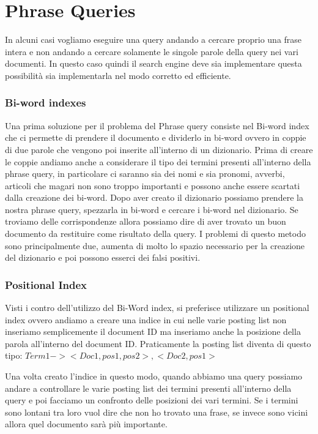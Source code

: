 \documentclass[14pt]{extreport}
\begin{document}
\chapter{Phrase Queries}

In alcuni casi vogliamo eseguire una query andando a cercare proprio una frase intera e non andando a cercare solamente le singole parole della query nei vari documenti. In questo caso quindi il search engine deve sia implementare questa possibilità sia implementarla nel modo corretto ed efficiente.


\subsection{Bi-word indexes}

Una prima soluzione per il problema del Phrase query consiste nel Bi-word index che ci permette di prendere il documento e dividerlo in bi-word ovvero in coppie di due parole che vengono poi inserite all'interno di un dizionario.
Prima di creare le coppie andiamo anche a considerare il tipo dei termini presenti all'interno della phrase query, in particolare ci saranno sia dei nomi e sia pronomi, avverbi, articoli che magari non sono troppo importanti e possono anche essere scartati dalla creazione dei bi-word.
Dopo aver creato il dizionario possiamo prendere la nostra phrase query, spezzarla in bi-word e cercare i bi-word nel dizionario.
Se troviamo delle corrispondenze allora possiamo dire di aver trovato un buon documento da restituire come risultato della query.
I problemi di questo metodo sono principalmente due, aumenta di molto lo spazio necessario per la creazione del dizionario e poi possono esserci dei falsi positivi.

\subsection{Positional Index}

Visti i contro dell'utilizzo del Bi-Word index, si preferisce utilizzare un positional index ovvero andiamo a creare una indice in cui nelle varie posting list non inseriamo semplicemente il document ID ma inseriamo anche la posizione della parola all'interno del document ID.
Praticamente la posting list diventa di questo tipo:
\newline
$Term1 -> <Doc1, pos1, pos2>, <Doc2, pos1>$

Una volta creato l'indice in questo modo, quando abbiamo una query possiamo andare a controllare le varie posting list dei termini presenti all'interno della query e poi facciamo un confronto delle posizioni dei vari termini. Se i termini sono lontani tra loro vuol dire che non ho trovato una frase, se invece sono vicini allora quel documento sarà più importante.
\end{document}
